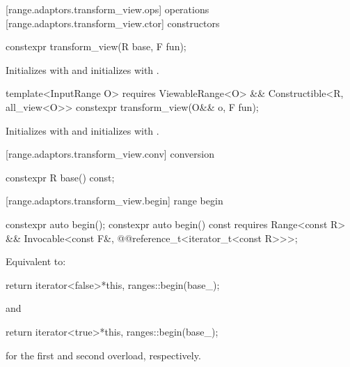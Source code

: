 [range.adaptors.transform_view.ops]{ operations}
[range.adaptors.transform_view.ctor]{ constructors}

%
\begin{itemdecl}
constexpr transform_view(R base, F fun);
\end{itemdecl}

\begin{itemdescr}
\pnum
\effects Initializes  with  and initializes
 with .
\end{itemdescr}

%
\begin{itemdecl}
template<InputRange O>
  requires ViewableRange<O> && Constructible<R, all_view<O>>
constexpr transform_view(O&& o, F fun);
\end{itemdecl}

\begin{itemdescr}
\pnum
\effects Initializes  with 
and initializes  with .
\end{itemdescr}

[range.adaptors.transform_view.conv]{ conversion}

%
\begin{itemdecl}
constexpr R base() const;
\end{itemdecl}

\begin{itemdescr}
\pnum
\oldtxt{\returns}  
\end{itemdescr}

[range.adaptors.transform_view.begin]{ range begin}

%
\begin{itemdecl}
constexpr auto begin();
constexpr auto begin() const requires Range<const R> &&
  Invocable<const F&, @@reference_t<iterator_t<const R>>>;
\end{itemdecl}

\begin{itemdescr}
\pnum
\effects Equivalent to:
\begin{codeblock}
return iterator<false>{*this, ranges::begin(base_)};
\end{codeblock}
  and
\begin{codeblock}
return iterator<true>{*this, ranges::begin(base_)};
\end{codeblock}
for the first and second overload, respectively.
\end{itemdescr}

